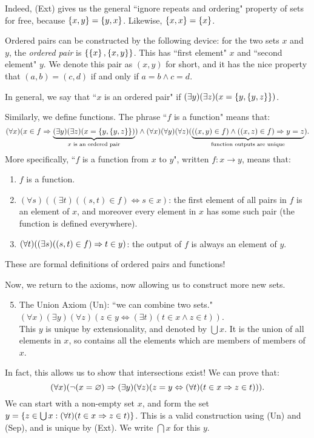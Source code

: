 \documentclass{article}
\begin{document}
\begin{remark}
    Indeed, (Ext) gives us the general ``ignore repeats and ordering" property of sets for free, because $\left\lbrace x, y \right\rbrace = \left\lbrace y, x \right\rbrace$. Likewise, $\left\lbrace x, x \right\rbrace = \left\lbrace x \right\rbrace$.
    
    Ordered pairs can be constructed by the following device: for the two sets $x$ and $y$, the \textit{ordered pair} is $\left\lbrace \left\lbrace x \right\rbrace, \left\lbrace x,y \right\rbrace \right\rbrace$. This has ``first element" $x$ and ``second element" $y$. We denote this pair as $(x, y)$ for short, and it has the nice property that $(a, b) = (c, d)$ if and only if $a=b \land c=d$.
    
    In general, we say that ``$x$ is an ordered pair" if $(\exists y)(\exists z)(x = \left\lbrace y, \left\lbrace y, z \right\rbrace \right\rbrace)$.
    
    Similarly, we define functions. The phrase ``$f$ is a function" means that:
    \[
	(\forall x)(
	x \in f \Rightarrow
	\underbrace{(\exists y)(\exists z)(x = \left\lbrace y, \left\lbrace y, z \right\rbrace \right\rbrace)}_{\text{$x$ is an ordered pair}})
	\land 
	(\forall x)(\forall y)(\forall z) (
	\underbrace{((x, y) \in f) \land ((x, z) \in f) \Rightarrow y=z}_{\text{function outputs are unique}}).
	\]
	More specifically, ``$f$ is a function from $x$ to $y$", written $f: x \to y$, means that:
	\begin{enumerate}
	    \item $f$ is a function.
	    \item $(\forall s)((\exists t)((s, t) \in f) \Leftrightarrow s \in x)$: the first element of all pairs in $f$ is an element of $x$, and moreover every element in $x$ has some such pair (the function is defined everywhere).
	    \item $(\forall t)((\exists s)((s, t) \in f) \Rightarrow t \in y)$: the output of $f$ is always an element of $y$.
	\end{enumerate}
	These are formal definitions of ordered pairs and functions!
\end{remark}

Now, we return to the axioms, now allowing us to construct more new sets.

\begin{enumerate}
	\setcounter{enumi}{4}
    \item The Union Axiom (Un): ``we can combine two sets." \\
    $(\forall x)(\exists y)(\forall z)(z \in y \Leftrightarrow (\exists t)(t \in x \land z \in t))$. \\
    This $y$ is unique by extensionality, and denoted by $\bigcup x$. It is the union of all elements in $x$, so contains all the elements which are members of members of $x$.
\end{enumerate}
In fact, this allows us to show that intersections exist! We can prove that:
\[
(\forall x)(\lnot(x = \varnothing) \Rightarrow (\exists y)(\forall z)(z = y \Leftrightarrow (\forall t)(t \in x \Rightarrow z \in t))).
\]
We can start with a non-empty set $x$, and form the set $y = \left\lbrace z \in \bigcup x : (\forall t)(t \in x \Rightarrow z \in t) \right\rbrace$. This is a valid construction using (Un) and (Sep), and is unique by (Ext). We write $\bigcap x$ for this $y$.
\end{document}
